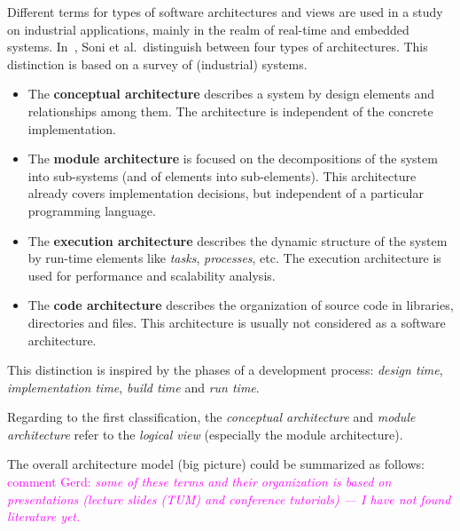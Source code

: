 \documentclass{llncs} %
\newcommand{\ggr}[1]{\textcolor{magenta}{comment Gerd: \textit{#1}}}
\begin{document}
Different terms for types of software architectures and views are used in a study 
on industrial applications, mainly in the realm of real-time and embedded systems.
In~\cite{DBLP:conf/icse/SoniNH95}, Soni et al.~distinguish between four types of architectures.
This distinction is based on a survey of (industrial) systems.
 \begin{itemize}
	 \item The \textbf{conceptual architecture} describes a system by design elements
	and relationships among them. The architecture is independent of the concrete implementation.
		\item The \textbf{module architecture} is focused on the decompositions of the
		  system into sub-systems (and of elements into sub-elements). 
			 This architecture already covers implementation decisions,
			 but independent of a particular programming language.
			 
	  \item The \textbf{execution architecture} describes the dynamic structure of the system
		        by run-time elements like \emph{tasks}, \emph{processes}, etc.
						The execution architecture is used for performance and scalability analysis.
		 \item The \textbf{code architecture} describes the organization of source code in
		       libraries, directories and files.
					This architecture is usually not considered as a software architecture.
 \end{itemize}

This distinction is inspired by the phases of a development process:
\emph{design time}, \emph{implementation time}, \emph{build time} and \emph{run time}.

Regarding to the first classification, the \emph{conceptual architecture} and \emph{module architecture}
refer to the \emph{logical view} (especially the module architecture).



The overall architecture model (big picture) could be summarized as follows:
\ggr{some of these terms and their organization is based on
      presentations (lecture slides (TUM) and conference tutorials)  --- I have not found 
			 literature yet.}
			
\end{document}
